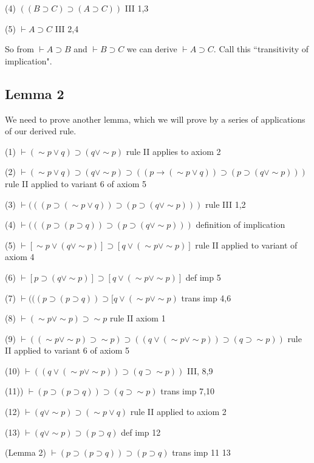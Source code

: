 \documentclass[12pt]{article}
\begin{document}
(4) $((B \supset C) \supset (A \supset C))$  III  1,3

(5)  $\vdash A \supset C$  III 2,4

So from $\vdash A \supset B$ and $\vdash B \supset C$ we can derive $\vdash A \supset C$.  Call this ``transitivity of implication".

\subsection{Lemma 2}

We need to prove another lemma, which we will prove by a series of applications of our derived rule.

(1) $\vdash (\sim p \vee q) \supset (q \vee \sim p)$  rule II applies to axiom 2

(2) $\vdash (\sim p \vee q) \supset (q \vee \sim p) \supset ((p \rightarrow (\sim p \vee q)) \supset (p \supset (q \vee \sim p)))$  rule II applied to variant 6 of axiom 5

(3) $\vdash (((p \supset (\sim p \vee q)) \supset (p \supset (q \vee \sim p)))$  rule III  1,2

(4) $\vdash (((p \supset (p \supset q)) \supset (p \supset (q \vee \sim p)))$ definition of implication

(5) $\vdash [\sim p \vee  (q \vee \sim p)] \supset [q \vee (\sim p \vee \sim p)]$ rule II applied to variant of axiom 4

(6) $\vdash [p \supset  (q \vee \sim p)] \supset [q \vee (\sim p \vee \sim p)]$ def imp 5

(7) $\vdash (((p \supset (p \supset q)) \supset [q \vee (\sim p \vee \sim p)$  trans imp 4,6

(8)  $\vdash (\sim p \vee \sim p) \supset \sim p$  rule II axiom 1

(9) $\vdash ((\sim p \vee \sim p) \supset \sim p)\supset ((q \vee (\sim p \vee \sim p)) \supset (q \supset \sim p))$  rule II applied to variant 6 of axiom 5

(10) $\vdash ((q \vee (\sim p \vee \sim p)) \supset (q \supset \sim p))$  III, 8,9

(11)) $\vdash (p \supset (p \supset q) ) \supset (q \supset \sim p)$  trans imp 7,10

(12) $\vdash (q \vee \sim p) \supset (\sim p \vee q)$  rule II applied to axiom 2

(13) $\vdash (q \vee \sim p) \supset (p \supset q)$  def imp 12

(Lemma 2) $\vdash (p \supset(p \supset q)) \supset (p \supset q)$  trans imp 11 13
\end{document}
